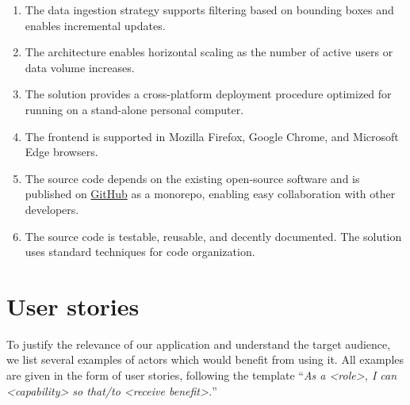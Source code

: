 \begin{enumerate}[label=\textbf{N\arabic*}]
\item The data ingestion strategy supports filtering based on bounding boxes and enables incremental updates.
\item The architecture enables horizontal scaling as the number of active users or data volume increases.
\item The solution provides a cross-platform deployment procedure optimized for running on a stand-alone personal computer.
\item The frontend is supported in Mozilla Firefox, Google Chrome, and Microsoft Edge browsers.
\item The source code depends on the existing open-source software and is published on \href{https://github.com/}{GitHub} as a monorepo, enabling easy collaboration with other developers.
\item The source code is testable, reusable, and decently documented. The solution uses standard techniques for code organization.
\end{enumerate}

\section{User stories}\label{sec:user-stories}

To justify the relevance of our application and understand the target audience, we list several examples of actors which would benefit from using it. All examples are given in the form of user stories, following the template ``\emph{As a <role>, I can <capability> so that/to <receive benefit>.}''

